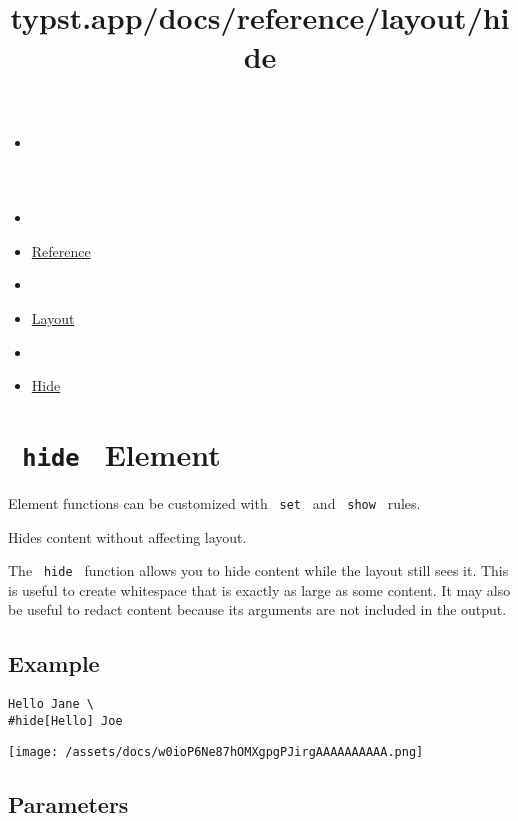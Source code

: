\title{typst.app/docs/reference/layout/hide}

\begin{itemize}
\tightlist
\item
  \href{/docs}{}
\item
  
\item
  \href{/docs/reference/}{Reference}
\item
  
\item
  \href{/docs/reference/layout/}{Layout}
\item
  
\item
  \href{/docs/reference/layout/hide/}{Hide}
\end{itemize}

\section{\texorpdfstring{\texttt{\ hide\ } {{ Element
}}}{ hide   Element }}\label{summary}

\label{element-tooltip}
Element functions can be customized with \texttt{\ set\ } and
\texttt{\ show\ } rules.

Hides content without affecting layout.

The \texttt{\ hide\ } function allows you to hide content while the
layout still \textquotesingle sees\textquotesingle{} it. This is useful
to create whitespace that is exactly as large as some content. It may
also be useful to redact content because its arguments are not included
in the output.

\subsection{Example}\label{example}

\begin{verbatim}
Hello Jane \
#hide[Hello] Joe
\end{verbatim}

\texttt{[image: /assets/docs/w0ioP6Ne87hOMXgpgPJirgAAAAAAAAAA.png]}

\subsection{\texorpdfstring{{ Parameters
}}{ Parameters }}\label{parameters}

